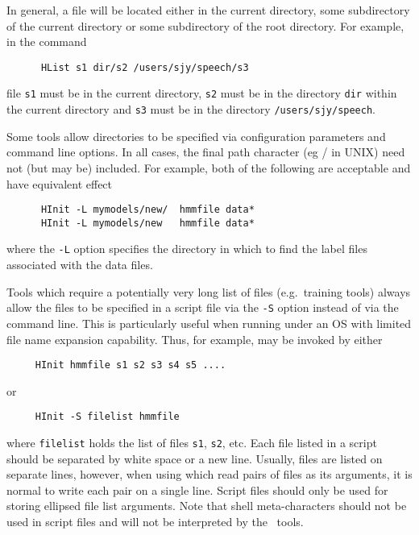 In general, a file will be located either in
the current directory, some subdirectory of the current directory or some
subdirectory of the root directory.  For example, in the command
\begin{verbatim}
      HList s1 dir/s2 /users/sjy/speech/s3
\end{verbatim}
file \texttt{s1} must be in the current directory, \texttt{s2} must be in the
directory \texttt{dir} within the current directory and \texttt{s3} must be in the
directory \texttt{/users/sjy/speech}.

Some tools allow directories to be specified via configuration
parameters and command line options.  In all cases, the final path
character (eg / in UNIX) need not (but may be)
included.  For example, both of the following are acceptable and have
equivalent effect
\begin{verbatim}
      HInit -L mymodels/new/  hmmfile data*
      HInit -L mymodels/new   hmmfile data*
\end{verbatim}  
where the \texttt{-L} option specifies the directory in which to find the 
label files associated with the data files. 


Tools which require a potentially very long list of files (e.g.\ training
tools) always allow the files to be specified in a script
file via the \texttt{-S} option instead of via the command
line.
This is particularly useful when running
under an OS with limited file name expansion capability.  Thus, for example,
 may be invoked by either
\begin{verbatim}
     HInit hmmfile s1 s2 s3 s4 s5 ....
\end{verbatim}  
or
\begin{verbatim}
     HInit -S filelist hmmfile
\end{verbatim}          
where \texttt{filelist} holds the list of files \texttt{s1}, \texttt{s2}, etc.
Each file listed in a script should be separated by white space or a new line.
Usually, files are listed on separate lines, however, when using
 which read pairs of files as its
arguments, it is normal to write each pair on a single line.  Script files
should only be used for storing ellipsed
file list arguments. Note that shell meta-characters should not be
used in script files and will not be interpreted by the \HTK\ tools.

